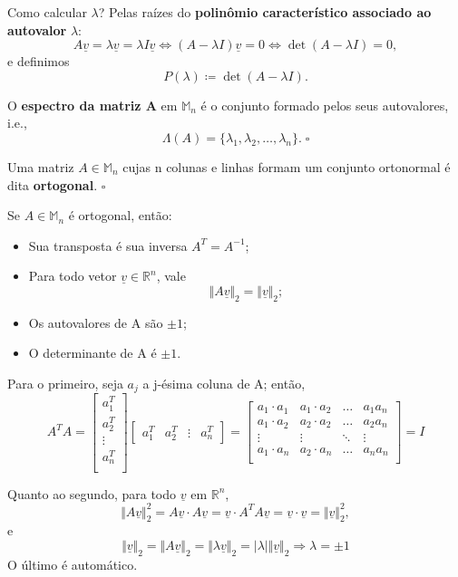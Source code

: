 \documentclass[../numerical_methods.tex]{subfiles}
\begin{document}
Como calcular \(\lambda \)? Pelas raízes do \textbf{polinômio característico associado ao autovalor} \(\lambda \):
\[
	A\underline{v} = \lambda \underline{v} = \lambda I \underline{v} \Longleftrightarrow (A - \lambda I)\underline{v} = 0 \Longleftrightarrow \det{(A - \lambda I)} = 0,
\]
e definimos
\[
	P(\lambda ) \coloneqq \det{(A - \lambda I)}.
\]
\begin{def*}
	O \textbf{espectro da matriz A} em \(\mathbb{M}_{n}\) é o conjunto formado pelos seus autovalores, i.e.,
	\[
		\Lambda (A) = \{\lambda_1, \lambda_2, \dotsc , \lambda_{n}\}. \; \square
	\]
\end{def*}
\begin{def*}
	Uma matriz \(A\in \mathbb{M}_{n}\) cujas n colunas e linhas formam um conjunto ortonormal é dita \textbf{ortogonal}. \(\square\)
\end{def*}
\begin{prop*}
	Se \(A\in \mathbb{M}_{n}\) é ortogonal, então:
	\begin{itemize}
		\item[1)] Sua transposta é sua inversa \(A^{T} = A^{-1}\);
		\item[2)] Para todo vetor \(\underline{v}\in \mathbb{R}^{n}\), vale
		      \[
			      \Vert A \underline{v} \Vert_{2} = \Vert \underline{v} \Vert_{2};
		      \]
		\item[3)] Os autovalores de A são \(\pm 1\);
		\item[4)] O determinante de A é \(\pm 1\).
	\end{itemize}
\end{prop*}
\begin{proof*}
	Para o primeiro, seja \(a_{j}\) a j-ésima coluna de A; então,
	\[
		A^{T}A = \begin{bmatrix}
			a_{1}^{T} \\
			a_{2}^{T} \\
			\vdots    \\
			a_{n}^{T} \\
		\end{bmatrix}\begin{bmatrix}
			a_{1}^{T} &
			a_{2}^{T} &
			\vdots    &
			a_{n}^{T}
		\end{bmatrix} = \begin{bmatrix}
			a_{1} \cdot a_{1}^{} & a_{1} \cdot a_2 & \dotsc & a_1 a_{n} \\
			a_{1} \cdot a_{2}^{} & a_{2} \cdot a_2 & \dotsc & a_2 a_{n} \\
			\vdots               & \vdots          & \ddots & \vdots    \\
			a_{1} \cdot a_{n}^{} & a_{2} \cdot a_n & \dotsc & a_n a_{n} \\
		\end{bmatrix} = I
	\]

	Quanto ao segundo, para todo \(\underline{v}\) em \(\mathbb{R}^{n}\),
	\[
		\Vert A \underline{v} \Vert_{2}^{2}= A \underline{v} \cdot A \underline{v} = \underline{v} \cdot A^{T}A \underline{v} = \underline{v} \cdot \underline{v} = \Vert \underline{v} \Vert_{2}^{2},
	\]
	e
	\[
		\Vert \underline{v} \Vert_{2} = \Vert A\underline{v} \Vert_{2}=\Vert \lambda \underline{v} \Vert_{2}=| \lambda  |\Vert \underline{v} \Vert_{2} \Rightarrow \lambda =\pm1
	\]
	O último é automático. \qedsymbol
\end{proof*}
\end{document}

